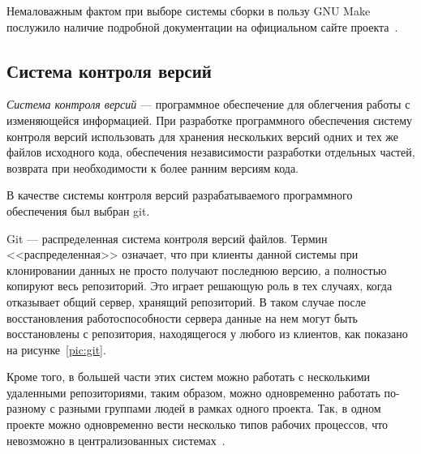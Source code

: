 Немаловажным фактом при выборе системы сборки в пользу GNU Make 
послужило наличие подробной документации на официальном сайте 
проекта~\cite{doc_make}.

\subsection{Система контроля версий}

\textit{Система контроля версий} --- программное обеспечение для облегчения
работы с изменяющейся информацией.
При разработке программного обеспечения систему контроля версий использовать
для хранения нескольких версий одних и тех же файлов исходного кода,
обеспечения независимости разработки отдельных частей,
возврата при необходимости к более ранним версиям кода.

В качестве системы контроля версий разрабатываемого программного обеспечения
был выбран git.

Git --- распределенная система контроля версий файлов.
Термин <<распределенная>> означает, что при клиенты данной системы при
клонировании данных не просто получают последнюю версию,
а полностью копируют весь репозиторий.
Это играет решающую роль в тех случаях, когда отказывает 
общий сервер, хранящий репозиторий. 
В таком случае после восстановления работоспособности сервера данные
на нем могут быть восстановлены с репозитория,
находящегося у любого из клиентов, как показано на рисунке~\ref{pic:git}.

Кроме того, в большей части этих систем можно работать с несколькими
удаленными репозиториями, таким образом, можно одновременно работать по-разному
с разными группами людей в рамках одного проекта.
Так, в одном проекте можно одновременно вести несколько типов рабочих процессов,
что невозможно в централизованных системах~\cite{doc_scm}.

\newpage

